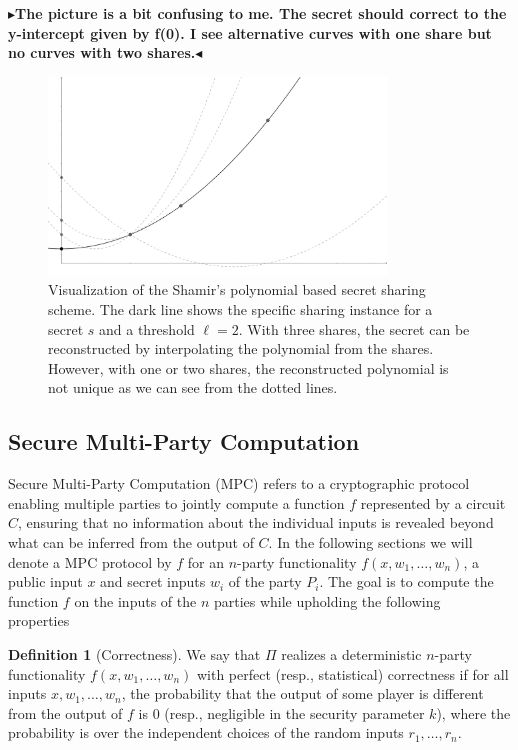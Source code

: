 \documentclass[11pt]{report}
\theoremstyle{definition}
\newtheorem{definition}{Definition}[section]
\theoremstyle{plain}
\newcommand{\todo}[1]{{\color[rgb]{.5,0,0}\textbf{$\blacktriangleright$#1$\blacktriangleleft$}}}
\begin{document}
\todo{The picture is a bit confusing to me. The secret should correct to the y-intercept given by f(0). I see alternative curves with one share but no curves with two shares.}
\begin{figure}
  \centering
  \includegraphics[width=0.8\textwidth]{images/shamir.png}
  \caption{Visualization of the Shamir's polynomial based secret sharing scheme. The dark line shows the specific sharing instance for a secret $s$ and a threshold $\ell=2$. With three shares, the secret can be reconstructed by interpolating the polynomial from the shares. However, with one or two shares, the reconstructed polynomial is not unique as we can see from the dotted lines.}\label{fig:shamir}
\end{figure}

\subsection{Secure Multi-Party Computation}\label{sec:mpc}

Secure Multi-Party Computation (MPC) refers to a cryptographic protocol enabling multiple parties to jointly compute a function $f$ represented by a circuit $C$, ensuring that no information about the individual inputs is revealed beyond what can be inferred from the output of $C$. In the following sections we will denote a MPC protocol by $f$ for an $n$-party functionality $f(x, w_1, \dots, w_n)$, a public input $x$ and secret inputs $w_i$ of the party $P_i$. The goal is to compute the function $f$ on the inputs of the $n$ parties while upholding the following properties~\cite{cramer2015secure}

\begin{definition}[Correctness]\label{def:mpc-correctness}
  We say that $\Pi$ realizes a deterministic $n$-party functionality $f(x, w_1, \dots, w_n)$ with perfect (resp., statistical) correctness if for all inputs $x, w_1, \dots, w_n$, the probability that the output of some player is different from the output of $f$ is $0$ (resp., negligible in the security parameter $k$), where the probability is over the independent choices of the random inputs $r_1, \dots, r_n$.
\end{definition}
\end{document}
